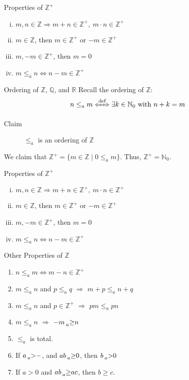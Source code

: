 \documentclass[10pt]{extarticle}
\newcommand{\N}{\mathbb{N}}
\newcommand{\Q}{\mathbb{Q}}
\newcommand{\Z}{\mathbb{Z}}
\newcommand{\R}{\mathbb{R}}
\begin{document}
  \begin{problem}{Properties of $\Z^+$}
    \begin{enumerate}[(i)]
      \item $m,n\in \Z\Rightarrow m+n\in\Z^+,~m\cdot n\in \Z^+$
      \item $m\in \Z$, then $m\in \Z^+$ or $-m\in\Z^+$
      \item $m,-m\in \Z^+$, then $m=0$
      \item $m\leq_a n \Leftrightarrow n-m\in\Z^+$
    \end{enumerate}
  \end{problem}
  \begin{problem}{Ordering of $\Z$, $\Q$, and $\R$}
    Recall the ordering of $\Z$:
    \[
      n\leq_a m \xLeftrightarrow{\text{def}} \exists k\in \N_0~\text{with } n+k=m
    \] 
    \begin{description}
      \item[Claim] $\leq_a$ is an ordering of $\Z$
    \end{description}
    We claim that $\Z^+ = \{m\in\Z\mid 0\leq_a m\}$. Thus, $\Z^+ = \N_0$.
    \begin{problem}{Properties of $\Z^+$}
      \begin{enumerate}[(i)]
        \item $m,n\in \Z\Rightarrow m+n\in\Z^+,~m\cdot n\in \Z^+$
        \item $m\in \Z$, then $m\in \Z^+$ or $-m\in\Z^+$
        \item $m,-m\in \Z^+$, then $m=0$
        \item $m\leq_a n \Leftrightarrow n-m\in\Z^+$
      \end{enumerate}
    \end{problem}
    \begin{problem}{Other Properties of $\Z$}
      \begin{enumerate}[(\arabic*)]
        \item $n\leq_a m\Leftrightarrow m-n\in\Z^+$
        \item $m\leq_a n$ and $p\leq_a q$ $\Rightarrow$ $m+p \leq_a n+q$
        \item $m\leq_a n$ and $p\in \Z^+$ $\Rightarrow$ $pm\leq_a pn$
        \item $m\leq_a n$ $\Rightarrow$ $-m \prescript{}{a}\geq n$
        \item $\leq_a$ is total.
        \item If $a \prescript{}{a}>-$, and $ab \prescript{}{a}\geq 0$, then $b\prescript{}{a}>0$
        \item If $a > 0$ and $ab \prescript{}{a}\geq ac$, then $b\geq c$.

\end{enumerate}
\end{problem}
\end{problem}
\end{document}
